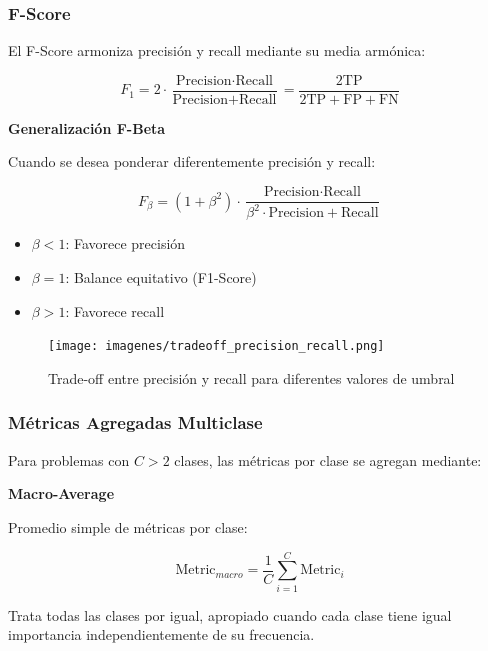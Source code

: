 \subsubsection{F-Score}

El F-Score armoniza precisión y recall mediante su media armónica:

\begin{equation}
F_1 = 2 \cdot \frac{\text{Precision} \cdot \text{Recall}}{\text{Precision} + \text{Recall}} = \frac{2\text{TP}}{2\text{TP} + \text{FP} + \text{FN}}
\end{equation}

\textbf{Generalización F-Beta}

Cuando se desea ponderar diferentemente precisión y recall:

\begin{equation}
F_\beta = (1 + \beta^2) \cdot \frac{\text{Precision} \cdot \text{Recall}}{\beta^2 \cdot \text{Precision} + \text{Recall}}
\end{equation}

\begin{itemize}
\item $\beta < 1$: Favorece precisión
\item $\beta = 1$: Balance equitativo (F1-Score)
\item $\beta > 1$: Favorece recall
\end{itemize}

\begin{figure}[h]
\centering
\texttt{[image: imagenes/tradeoff\_precision\_recall.png]}
\caption{Trade-off entre precisión y recall para diferentes valores de umbral}
\label{fig:tradeoff}
\end{figure}

\subsubsection{Métricas Agregadas Multiclase}

Para problemas con $C > 2$ clases, las métricas por clase se agregan mediante:

\textbf{Macro-Average}

Promedio simple de métricas por clase:

\begin{equation}
\text{Metric}_{macro} = \frac{1}{C}\sum_{i=1}^{C} \text{Metric}_i
\end{equation}

Trata todas las clases por igual, apropiado cuando cada clase tiene igual importancia independientemente de su frecuencia.

